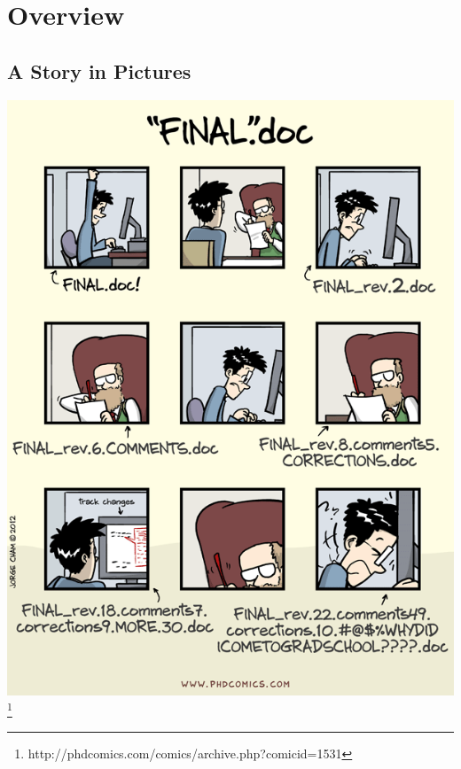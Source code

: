 \section{Overview}

\subsection{A Story in Pictures}
\begin{frame}
  \centering
  \includegraphics[height=0.95\textheight]{phd1531}
  \footnote{http://phdcomics.com/comics/archive.php?comicid=1531}
\end{frame}
